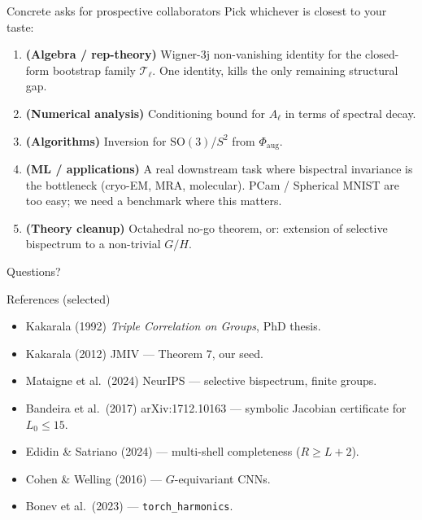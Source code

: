 \documentclass[10pt,aspectratio=169]{beamer}
\newcommand{\SO}{\mathrm{SO}}
\begin{document}
\begin{frame}{Concrete asks for prospective collaborators}
Pick whichever is closest to your taste:
\begin{enumerate}
  \item \textbf{(Algebra / rep-theory)}
        Wigner-3j non-vanishing identity for the closed-form
        bootstrap family $\mathcal T_\ell$. One identity, kills the only
        remaining structural gap.
  \item \textbf{(Numerical analysis)}
        Conditioning bound for $A_\ell$ in terms of spectral decay.
  \item \textbf{(Algorithms)}
        Inversion for $\SO(3)$/$S^2$ from $\Phi_\mathrm{aug}$.
  \item \textbf{(ML / applications)}
        A real downstream task where bispectral invariance is the
        bottleneck (cryo-EM, MRA, molecular). PCam / Spherical MNIST
        are too easy; we need a benchmark where this matters.
  \item \textbf{(Theory cleanup)}
        Octahedral no-go theorem, or: extension of selective bispectrum
        to a non-trivial $G/H$.
\end{enumerate}
\end{frame}

\begin{frame}[standout]
Questions?
\end{frame}

\appendix

\begin{frame}{References (selected)}
\small
\begin{itemize}
  \item Kakarala (1992) \emph{Triple Correlation on Groups}, PhD thesis.
  \item Kakarala (2012) JMIV --- Theorem 7, our seed.
  \item Mataigne et al.\ (2024) NeurIPS --- selective bispectrum, finite groups.
  \item Bandeira et al.\ (2017) arXiv:1712.10163 --- symbolic Jacobian
        certificate for $L_0 \le 15$.
  \item Edidin \& Satriano (2024) --- multi-shell completeness ($R \ge L+2$).
  \item Cohen \& Welling (2016) --- $G$-equivariant CNNs.
  \item Bonev et al.\ (2023) --- \texttt{torch\_harmonics}.
\end{itemize}
\end{frame}
\end{document}
